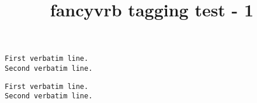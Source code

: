 \documentclass{article}
\title{fancyvrb tagging test - 1}
\begin{document}
\begin{Verbatim}
First verbatim line.
Second verbatim line.
\end{Verbatim}
\begin{verbatim}
First verbatim line.
Second verbatim line.
\end{verbatim}
\end{document}
